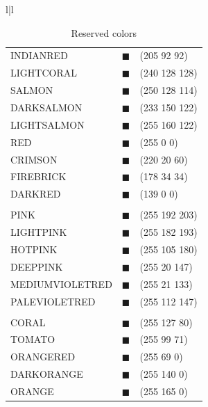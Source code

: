 \begin{table}[t]
\caption{Reserved colors}
\label{table_material_sample}
{\tiny
\begin{center}
\ifLwarp\else
\begin{tabular}{l|l}
\fi
\begin{tabular}{lll}
INDIANRED		& {\color[RGB]{205,92,92}$\blacksquare$}	& (205 92 92) \\
LIGHTCORAL		& {\color[RGB]{240,128,128}$\blacksquare$}	& (240 128 128) \\
SALMON			& {\color[RGB]{250,128,114}$\blacksquare$}	& (250 128 114) \\
DARKSALMON		& {\color[RGB]{233,150,122}$\blacksquare$}	& (233 150 122) \\
LIGHTSALMON		& {\color[RGB]{255,160,122}$\blacksquare$}	& (255 160 122) \\
RED				& {\color[RGB]{255,0,0}$\blacksquare$}		& (255 0 0) \\
CRIMSON			& {\color[RGB]{220,20,60}$\blacksquare$}	& (220 20 60) \\
FIREBRICK		& {\color[RGB]{178,34,34}$\blacksquare$}	& (178 34 34) \\
DARKRED			& {\color[RGB]{139,0,0}$\blacksquare$}		& (139 0 0) \\
\\
PINK			& {\color[RGB]{255,192,203}$\blacksquare$}	& (255 192 203)	\\
LIGHTPINK		& {\color[RGB]{255,182,193}$\blacksquare$}	& (255 182 193)	\\
HOTPINK			& {\color[RGB]{255,105,180}$\blacksquare$}	& (255 105 180)	\\
DEEPPINK		& {\color[RGB]{255, 20,147}$\blacksquare$}	& (255  20 147)	\\
MEDIUMVIOLETRED	& {\color[RGB]{199, 21,133}$\blacksquare$}	& (255  21 133)	\\
PALEVIOLETRED	& {\color[RGB]{219,112,147}$\blacksquare$}	& (255 112 147)	\\
\\
CORAL			& {\color[RGB]{255,127, 80}$\blacksquare$}	& (255 127 80)	\\
TOMATO			& {\color[RGB]{255, 99, 71}$\blacksquare$}	& (255  99 71)	\\
ORANGERED		& {\color[RGB]{255, 69,  0}$\blacksquare$}	& (255  69 0)	\\
DARKORANGE		& {\color[RGB]{255,140,  0}$\blacksquare$}	& (255 140 0)	\\
ORANGE			& {\color[RGB]{255,165,  0}$\blacksquare$}	& (255 165 0)	\\

\end{tabular}
\end{tabular}
\end{center}}
\end{table}
